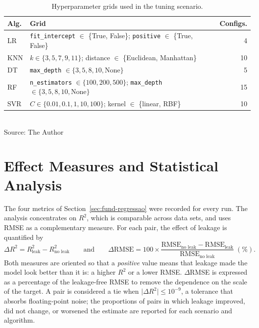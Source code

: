 \begin{table}[htb]
\centering
\caption{Hyperparameter grids used in the tuning scenario.}
\label{tab:grades}
\small
\begin{tabular}{lp{8.6cm}r}
\toprule
\textbf{Alg.} & \textbf{Grid} & \textbf{Configs.} \\
\midrule
LR  & \texttt{fit\_intercept} $\in$ \{True, False\}; \texttt{positive} $\in$ \{True, False\} & 4 \\
KNN & $k \in \{3, 5, 7, 9, 11\}$; distance $\in$ \{Euclidean, Manhattan\} & 10 \\
DT  & \texttt{max\_depth} $\in \{3, 5, 8, 10, \text{None}\}$ & 5 \\
RF  & \texttt{n\_estimators} $\in \{100, 200, 500\}$; \texttt{max\_depth} $\in \{3, 5, 8, 10, \text{None}\}$ & 15 \\
SVR & $C \in \{0.01, 0.1, 1, 10, 100\}$; kernel $\in$ \{linear, RBF\} & 10 \\
\bottomrule
\end{tabular}
\\[2pt]
\footnotesize Source: The Author
\end{table}

\section{Effect Measures and Statistical Analysis}
\label{sec:met-analise}

The four metrics of Section~\ref{sec:fund-regressao} were recorded for every
run. The analysis concentrates on $R^2$, which is comparable across data sets,
and uses RMSE as a complementary measure. For each pair, the effect of leakage is
quantified by
\begin{equation}
  \Delta R^2 = R^2_{\text{leak}} - R^2_{\text{no leak}}
  \qquad \text{and} \qquad
  \Delta\text{RMSE} = 100 \times \frac{\text{RMSE}_{\text{no leak}} - \text{RMSE}_{\text{leak}}}{\text{RMSE}_{\text{no leak}}}\;(\%).
  \label{eq:deltas}
\end{equation}
Both measures are oriented so that a \emph{positive} value means that leakage
made the model look better than it is: a higher $R^2$ or a lower RMSE. $\Delta$RMSE
is expressed as a percentage of the leakage-free RMSE to remove the dependence on
the scale of the target. A pair is considered a tie when
$\lvert \Delta R^2 \rvert \leq 10^{-9}$, a tolerance that absorbs floating-point
noise; the proportions of pairs in which leakage improved, did not change, or
worsened the estimate are reported for each scenario and algorithm.

